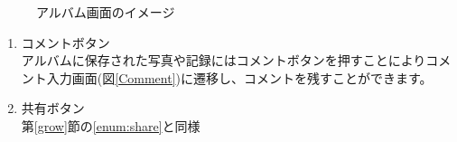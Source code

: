 \documentclass[a4j]{jarticle}
\begin{document}
\begin{figure}[H]
    \begin{center}
    \caption {アルバム画面のイメージ}
    \label{Albam}
    \end{center}
\end{figure}

\begin{enumerate}
  \renewcommand{\labelenumi}{\textcircled{\scriptsize \theenumi}}
  \item コメントボタン\\
    アルバムに保存された写真や記録にはコメントボタンを押すことによりコメント入力画面(図\ref{Comment})に遷移し、コメントを残すことができます。
  \item 共有ボタン\\
        第\ref{grow}節の\ref{enum:share}と同様
\end{enumerate}
\end{document}
